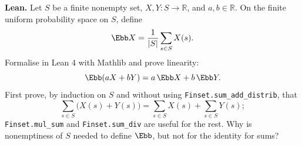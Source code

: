 \noindent\textbf{Lean.} Let $S$ be a finite nonempty set, $X,Y:S\to\mathbb R$,
and $a,b\in\mathbb R$. On the finite uniform probability space on $S$, define
\[ \Ebb X=\frac1{|S|}\sum_{s\in S}X(s). \]
Formalise in Lean 4 with Mathlib and prove linearity:
\[ \Ebb(aX+bY)=a\,\Ebb X+b\,\Ebb Y. \]
First prove, by induction on $S$ and without using \texttt{Finset.sum\_add\_distrib}, that
\[ \sum_{s\in S}\bigl(X(s)+Y(s)\bigr)=\sum_{s\in S}X(s)+\sum_{s\in S}Y(s); \]
\texttt{Finset.mul\_sum} and \texttt{Finset.sum\_div} are useful for the rest.
Why is nonemptiness of $S$ needed to define $\Ebb$, but not for the identity for sums?
